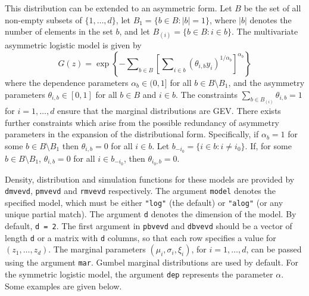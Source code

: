\documentclass[11pt,a4paper]{article}
\begin{document}
This distribution can be extended to an asymmetric form. 
Let $B$ be the set of all non-empty subsets of $\{1,\dots,d\}$, let $B_1=\{b \in B:|b|=1\}$, where $|b|$ denotes the number of elements in the set $b$,  and let $B_{(i)}=\{b \in B:i \in b\}$.
The multivariate asymmetric logistic model \citep{tawn90} is given by
\begin{equation*}
G(z)=\exp\left\{-\sum\nolimits_{b \in B} \left[\sum\nolimits_{i \in b}(\theta_{i,b}y_i)^{1/\alpha_b}\right]^{\alpha_b}\right\}
\end{equation*} 
where the dependence parameters $\alpha_b\in(0,1]$ for all $b\in B \setminus B_1$, and the asymmetry parameters $\theta_{i,b}\in[0,1]$ for all $b\in B$ and $i\in b$.
The constraints $\sum_{b \in B_{(i)}}\theta_{i,b}=1$ for $i=1,\dots,d$ ensure that the marginal distributions are GEV.
There exists further constraints which arise from the possible redundancy of asymmetry parameters in the expansion of the distributional form.
Specifically, if $\alpha_b=1$ for some $b\in B \setminus B_1$ then $\theta_{i,b}=0$ for all $i \in b$.
Let $b_{-i_0}=\{i \in b:i \neq i_0\}$.
If, for some $b \in B \setminus B_1$, $\theta_{i,b}=0$ for all $i \in b_{-i_0}$, then $\theta_{i_0,b}=0$.


Density, distribution and simulation functions for these models are provided by \verb+dmvevd+, \verb+pmvevd+ and \verb+rmvevd+ respectively.
The argument \verb+model+ denotes the specified model, which must be either \verb+"log"+ (the default) or \verb+"alog"+ (or any unique partial match).
The argument \verb+d+ denotes the dimension of the model.
By default, \verb+d = 2+.
The first argument in \verb+pbvevd+ and \verb+dbvevd+ should be a vector of length \verb+d+ or a matrix with \verb+d+ columns, so that each row specifies a value for $(z_1,\dots,z_d)$.
The marginal parameters $(\mu_i,\sigma_i,\xi_i)$, for $i=1,\dots,d$, can be passed using the argument \verb+mar+.
Gumbel marginal distributions are used by default.
For the symmetric logistic model, the argument  \verb+dep+ represents the parameter $\alpha$.
Some examples are given below.
\end{document}
